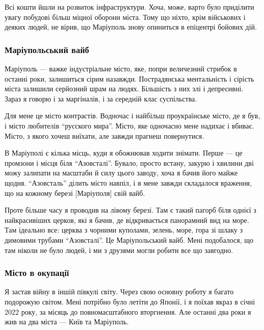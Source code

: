 Всі кошти йшли на розвиток інфраструктури. Хоча, може, варто було приділити
увагу побудові більш міцної оборони міста. Тому що ніхто, крім військових і
деяких людей, не вірив, що Маріуполь знову опиниться в епіцентрі бойових дій. 

\subsubsection{Маріупольський вайб}

Маріуполь — важке індустріальне місто, яке, попри величезний стрибок в останні
роки, залишиться сірим назавжди. Пострадянська ментальність і сірість міста
залишили серйозний шрам на людях. Більшість з них злі і депресивні. Зараз я
говорю і за маргіналів, і за середній клас суспільства.

Для мене це місто контрастів. Водночас і найбільш проукраїнське місто, де я
був, і місто любителів \enquote{русского мира}. Місто, яке одночасно мене надихає і
вбиває. Місто, з якого хочеш виїхати, але завжди прагнеш повернутися. 


В Маріуполі є кілька місць, куди я обожнював ходити знімати. Перше — це
промзони і місця біля \enquote{Азовсталі}. Бувало, просто встану, закурю і хвилини дві
можу залипати на масштаби й силу цього заводу, хоча я бачив його майже щодня.
\enquote{Азовсталь} ділить місто навпіл, і в мене завжди складалося враження, що на
кожному березі [Маріуполя] свій вайб. 

Проте більше часу я проводив на лівому березі. Там є такий пагорб біля однієї з
найкрасивіших церков, які я бачив, де відкривається панорамний вид на море. Там
ідеально все: церква з чорними куполами, зелень, море, гора зі шлаку з димовими
трубами \enquote{Азовсталі}. Це Маріупольський вайб. Мені подобалося, що там ніколи не
було людей, і ми з друзями могли робити все що завгодно.


\subsubsection{Місто в окупації}

Я застав війну в іншій півкулі світу. Через свою основну роботу я багато
подорожую світом. Мені потрібно було летіти до Японії, і я поїхав якраз в січні
2022 року, за місяць до повномасштабного вторгнення. Але останні два роки я жив
на два міста — Київ та Маріуполь.


